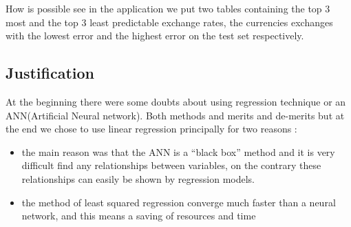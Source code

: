 \documentclass[sigconf]{acmart}
\begin{document}
How is possible see in the application we put two tables containing the top 3 most and the top 3 least predictable exchange rates, the currencies exchanges with the lowest error and the highest error on the test set respectively.


\subsection{Justification}

At the beginning there were some doubts about using regression technique or an ANN(Artificial Neural network).
Both methods and merits and de-merits but at the end we chose to use linear regression principally for two reasons : 
\begin{itemize}
\item the main reason was that the ANN is a “black box” method and it is very difficult find any relationships between variables, on the contrary these relationships can easily be shown by regression models. 
\item the method of least squared regression converge much faster than a neural network, and this means a saving of resources and time 


\end{itemize}















\end{document}
